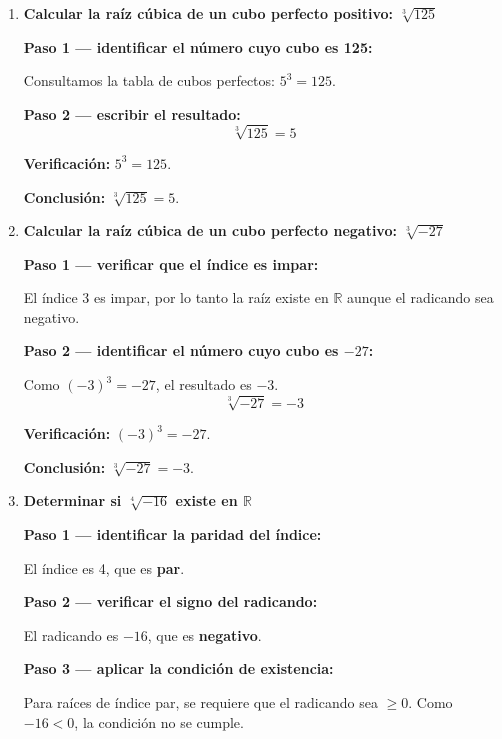 \documentclass[11pt, letterpaper]{article}
\begin{document}
\begin{tcolorbox}[examplebox, title={Ejemplos}]
\begin{enumerate}[label=\textbf{Ej. \arabic*.}, leftmargin=*, itemsep=18pt]

\item \textbf{Calcular la raíz cúbica de un cubo perfecto positivo: $\sqrt[3]{125}$}

\textbf{Paso 1 — identificar el número cuyo cubo es 125:}

Consultamos la tabla de cubos perfectos: $5^3 = 125$.

\textbf{Paso 2 — escribir el resultado:}
$$\sqrt[3]{125} = 5$$

\textbf{Verificación:} $5^3 = 125$. \checkmark

\textbf{Conclusión:} $\sqrt[3]{125} = 5$.

\item \textbf{Calcular la raíz cúbica de un cubo perfecto negativo: $\sqrt[3]{-27}$}

\textbf{Paso 1 — verificar que el índice es impar:}

El índice 3 es impar, por lo tanto la raíz existe en $\mathbb{R}$ aunque el radicando sea negativo.

\textbf{Paso 2 — identificar el número cuyo cubo es $-27$:}

Como $(-3)^3 = -27$, el resultado es $-3$.
$$\sqrt[3]{-27} = -3$$

\textbf{Verificación:} $(-3)^3 = -27$. \checkmark

\textbf{Conclusión:} $\sqrt[3]{-27} = -3$.

\item \textbf{Determinar si $\sqrt[4]{-16}$ existe en $\mathbb{R}$}

\textbf{Paso 1 — identificar la paridad del índice:}

El índice es 4, que es \textbf{par}.

\textbf{Paso 2 — verificar el signo del radicando:}

El radicando es $-16$, que es \textbf{negativo}.

\textbf{Paso 3 — aplicar la condición de existencia:}

Para raíces de índice par, se requiere que el radicando sea $\geq 0$. Como $-16 < 0$, la condición no se cumple.


\end{enumerate}
\end{tcolorbox}
\end{document}
